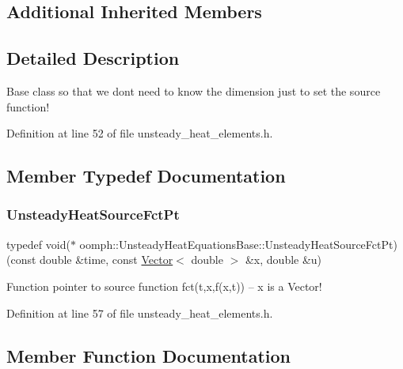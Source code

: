 \subsection*{Additional Inherited Members}


\subsection{Detailed Description}
Base class so that we don\textquotesingle{}t need to know the dimension just to set the source function! 

Definition at line 52 of file unsteady\+\_\+heat\+\_\+elements.\+h.



\subsection{Member Typedef Documentation}
\mbox{\label{classoomph_1_1UnsteadyHeatEquationsBase_accf23819639b695221238a0e7b1c8384}} 
\subsubsection{\texorpdfstring{Unsteady\+Heat\+Source\+Fct\+Pt}{UnsteadyHeatSourceFctPt}}
{\footnotesize\ttfamily typedef void($\ast$ oomph\+::\+Unsteady\+Heat\+Equations\+Base\+::\+Unsteady\+Heat\+Source\+Fct\+Pt) (const double \&time, const \hyperlink{classoomph_1_1Vector}{Vector}$<$ double $>$ \&x, double \&u)}



Function pointer to source function fct(t,x,f(x,t)) -- x is a Vector! 



Definition at line 57 of file unsteady\+\_\+heat\+\_\+elements.\+h.



\subsection{Member Function Documentation}
\mbox{\label{classoomph_1_1UnsteadyHeatEquationsBase_a723b841dae0679dcfda13e565dd40f6b}} 
